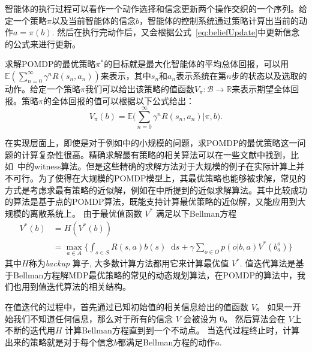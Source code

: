 \documentclass{article}
\newcommand{\reals}{\mathbb{R}}
\newcommand{\expectation}{\mathbb{E}}
\newcommand{\states}{S}
\newcommand{\actions}{A}
\newcommand{\observables}{O}
\newcommand{\reward}{R}
\newcommand{\discount}{\gamma}
\newcommand{\beliefs}{\mathcal{B}}
\newcommand{\policy}{\pi}
\newcommand{\diff}[1]{\mathop{}\!\mathrm{d}#1}
\begin{document}
智能体的执行过程可以看作一个动作选择和信念更新两个操作交织的一个序列。给定一个策略$\policy$以及当前智能体的信念$b$，智能体的控制系统通过策略计算出当前的动作$a = \policy(b)$. 然后在执行完动作后，又会根据公式~\ref{eq:beliefUpdate}中更新信念的公式来进行更新。

求解POMDP的最优策略$\policy^{*}$的目标就是最大化智能体的平均总体回报，可以用 $\expectation(\sum_{n=0}^{\infty} \discount^{n} \reward(s_{n}, a_{n}))$来表示，其中$s_n$和$a_n$表示系统在第$n$步的状态以及选取的动作。给定一个策略$\policy$我们可以给出该策略的值函数$V_{\policy} \colon \beliefs \to \reals$来表示期望全体回报。策略$\policy$的全体回报的值可以根据以下公式给出：
\begin{equation}
	V_{\policy}(b) = \expectation\big(\sum_{n=0}^{\infty} \discount^{n} \reward(s_{n}, a_{n}) | \policy, b\big).
\end{equation}

在实现层面上，即使是对于例如\cite{ASurveyofPBPOMDP}中的小规模的问题，求POMDP的最优策略这一问题的计算复杂性很高。精确求解最有策略的相关算法可以在一些文献中找到，比如~\cite{article1}中的witness算法。但是这些精确的求解方法对于大规模的例子在实际计算上并不可行。为了使得在大规模的POMDP模型上，其最优策略也能够被求解，常见的方式是考虑求最有策略的近似解，例如在\cite{article2}中所提到的近似求解算法。其中比较成功的算法是基于点的POMDP算法，既能支持计算最优策略的近似解，又能应用到大规模的离散系统上\cite{ASurveyofPBPOMDP,PBVI}。
由于最优值函数 $V^{*}$ 满足以下Bellman方程\cite{article3}
\begin{equation}
	\begin{aligned}
		V^{*}(b) & = H(V^{*}(b)) \\
		& = \max_{a \in \actions} \Big\{\int_{s \in \states} \reward(s,a) b(s) \diff{s} + \discount \sum_{o \in \observables} p(o | b, a) V^{*}(b^{o}_{a})\Big\}
	\end{aligned}
	\label{eq:bellman}
\end{equation}
其中$H$称为\emph{backup} 算子, 大多数计算方法都用它来计算最优值 $V^{*}$. 值迭代算法是基于Bellman方程解MDP最优策略的常见的动态规划算法\cite{RLIntro}，在POMDP的算法中，我们也用到值迭代算法的相关结构\cite{ASurveyofPBPOMDP}。

在值迭代的过程中，首先通过已知初始值的相关信息给出的值函数 $V$。
如果一开始我们不知道任何信息，那么对于所有的信念 $V$ 会被设为 $0$。
然后算法会在 $V$上不断的迭代用$H$  计算Bellman方程直到到一个不动点。
当迭代过程终止时，计算出来的策略就是对于每个信念$b$都满足Bellman方程的动作$a$. 
\end{document}
